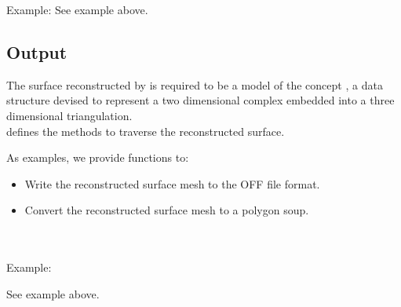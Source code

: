 Example:
See  example above.


\subsection{Output}

The surface reconstructed by  is required to be a model of the concept , a data structure devised to represent a two dimensional complex embedded into a three dimensional triangulation.\\

 defines the methods to traverse the reconstructed surface.

As examples, we provide functions to:

\begin{itemize}
\item Write the reconstructed surface mesh to the
      OFF file format.
\item Convert the reconstructed surface mesh to a
      polygon soup.
\end{itemize}

  \\
  \\

Example:

See  example above.
